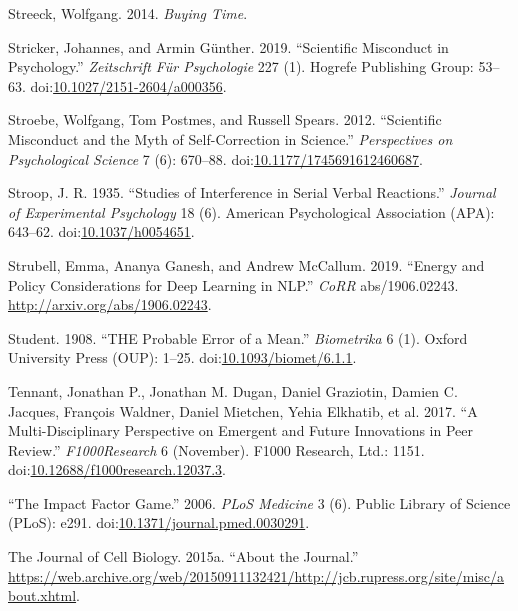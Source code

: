 \documentclass[a5paper]{book}
\begin{document}
\hypertarget{ref-isbn:9781781686195}{}
Streeck, Wolfgang. 2014. \emph{Buying Time}.

\hypertarget{ref-doi:10.1027ux2f2151-2604ux2fa000356}{}
Stricker, Johannes, and Armin Günther. 2019. ``Scientific Misconduct in
Psychology.'' \emph{Zeitschrift Für Psychologie} 227 (1). Hogrefe
Publishing Group: 53--63.
doi:\href{https://doi.org/10.1027/2151-2604/a000356}{10.1027/2151-2604/a000356}.

\hypertarget{ref-doi:10.1177ux2f1745691612460687}{}
Stroebe, Wolfgang, Tom Postmes, and Russell Spears. 2012. ``Scientific
Misconduct and the Myth of Self-Correction in Science.''
\emph{Perspectives on Psychological Science} 7 (6): 670--88.
doi:\href{https://doi.org/10.1177/1745691612460687}{10.1177/1745691612460687}.

\hypertarget{ref-doi:10.1037ux2fh0054651}{}
Stroop, J. R. 1935. ``Studies of Interference in Serial Verbal
Reactions.'' \emph{Journal of Experimental Psychology} 18 (6). American
Psychological Association (APA): 643--62.
doi:\href{https://doi.org/10.1037/h0054651}{10.1037/h0054651}.

\hypertarget{ref-DBLP:journalsux2fcorrux2fabs-1906-02243}{}
Strubell, Emma, Ananya Ganesh, and Andrew McCallum. 2019. ``Energy and
Policy Considerations for Deep Learning in NLP.'' \emph{CoRR}
abs/1906.02243. \url{http://arxiv.org/abs/1906.02243}.

\hypertarget{ref-doi:10.1093ux2fbiometux2f6.1.1}{}
Student. 1908. ``THE Probable Error of a Mean.'' \emph{Biometrika} 6
(1). Oxford University Press (OUP): 1--25.
doi:\href{https://doi.org/10.1093/biomet/6.1.1}{10.1093/biomet/6.1.1}.

\hypertarget{ref-doi:10.12688ux2ff1000research.12037.3}{}
Tennant, Jonathan P., Jonathan M. Dugan, Daniel Graziotin, Damien C.
Jacques, François Waldner, Daniel Mietchen, Yehia Elkhatib, et al. 2017.
``A Multi-Disciplinary Perspective on Emergent and Future Innovations in
Peer Review.'' \emph{F1000Research} 6 (November). F1000 Research, Ltd.:
1151.
doi:\href{https://doi.org/10.12688/f1000research.12037.3}{10.12688/f1000research.12037.3}.

\hypertarget{ref-doi:10.1371ux2fjournal.pmed.0030291}{}
``The Impact Factor Game.'' 2006. \emph{PLoS Medicine} 3 (6). Public
Library of Science (PLoS): e291.
doi:\href{https://doi.org/10.1371/journal.pmed.0030291}{10.1371/journal.pmed.0030291}.

\hypertarget{ref-cellbio2015}{}
The Journal of Cell Biology. 2015a. ``About the Journal.''
\url{https://web.archive.org/web/20150911132421/http://jcb.rupress.org/site/misc/about.xhtml}.
\end{document}
